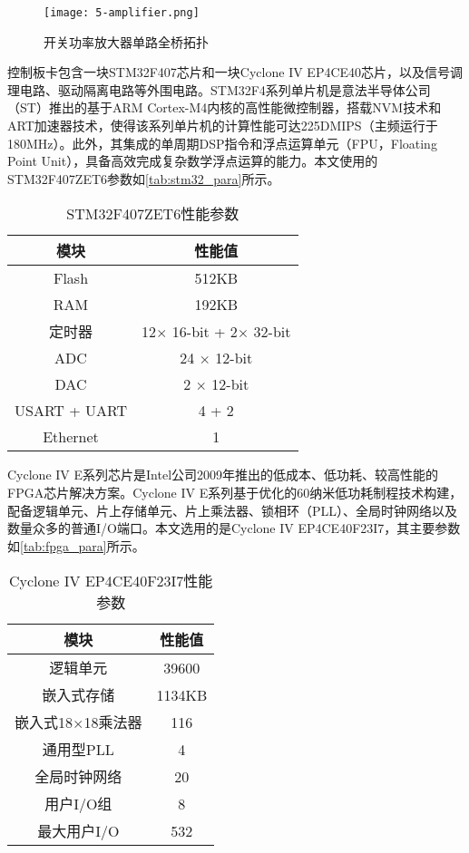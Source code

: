\documentclass[
  lang=cn,
  degree=master,
  openany,oneside
]{nuaathesis}
\begin{document}
\begin{figure}[h!]
	\texttt{[image: 5-amplifier.png]}
	\caption{开关功率放大器单路全桥拓扑}
	\label{fig:5-amplifier}
\end{figure}

控制板卡包含一块STM32F407芯片和一块Cyclone IV EP4CE40芯片，以及信号调理电路、驱动隔离电路等外围电路。STM32F4系列单片机是意法半导体公司（ST）推出的基于ARM Cortex-M4内核的高性能微控制器，搭载NVM技术和ART加速器技术，使得该系列单片机的计算性能可达225DMIPS（主频运行于180MHz）。此外，其集成的单周期DSP指令和浮点运算单元（FPU，Floating Point Unit），具备高效完成复杂数学浮点运算的能力。本文使用的STM32F407ZET6参数如\autoref{tab:stm32_para}所示。

\begin{table}[h!]
  \caption[STM32F407ZET6性能参数]{STM32F407ZET6性能参数\label{tab:stm32_para}}
  \begin{tabular}{cc}
    \toprule
    模块 & 性能值 \\
    \midrule
    Flash & 512KB\\
    RAM & 192KB\\
    定时器 & 12$\times$ 16-bit + 2$\times$ 32-bit\\
    ADC & 24 $\times$ 12-bit\\
    DAC & 2 $\times$ 12-bit\\
    USART + UART & 4 + 2\\
    Ethernet & 1	\\
    \bottomrule
  \end{tabular}
\end{table}

Cyclone IV E系列芯片是Intel公司2009年推出的低成本、低功耗、较高性能的FPGA芯片解决方案。Cyclone IV E系列基于优化的60纳米低功耗制程技术构建，配备逻辑单元、片上存储单元、片上乘法器、锁相环（PLL）、全局时钟网络以及数量众多的普通I/O端口。本文选用的是Cyclone IV EP4CE40F23I7，其主要参数如\autoref{tab:fpga_para}所示。

\begin{table}[h!]
  \caption[Cyclone IV EP4CE40F23I7性能参数]{Cyclone IV EP4CE40F23I7性能参数\label{tab:fpga_para}}
  \begin{tabular}{cc}
    \toprule
    模块 & 性能值 \\
    \midrule
    逻辑单元 & 39600\\
    嵌入式存储 & 1134KB\\
    嵌入式18$\times$18乘法器 & 116\\
    通用型PLL & 4\\
    全局时钟网络 & 20\\
    用户I/O组 & 8\\
    最大用户I/O & 532	\\
    \bottomrule
  \end{tabular}
\end{table}
\end{document}

